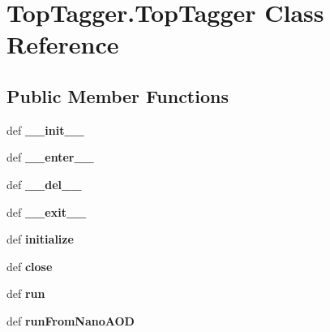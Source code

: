 \hypertarget{classTopTagger_1_1TopTagger}{\section{Top\-Tagger.\-Top\-Tagger Class Reference}
\label{classTopTagger_1_1TopTagger}
}
\subsection*{Public Member Functions}
\begin{DoxyCompactItemize}
\item 
\hypertarget{classTopTagger_1_1TopTagger_a161704f0abdbd30d84f9cbae3e6a3336}{def {\bfseries \-\_\-\-\_\-init\-\_\-\-\_\-}}\label{classTopTagger_1_1TopTagger_a161704f0abdbd30d84f9cbae3e6a3336}

\item 
\hypertarget{classTopTagger_1_1TopTagger_a01b9ce257815a42bf961804c02af4af4}{def {\bfseries \-\_\-\-\_\-enter\-\_\-\-\_\-}}\label{classTopTagger_1_1TopTagger_a01b9ce257815a42bf961804c02af4af4}

\item 
\hypertarget{classTopTagger_1_1TopTagger_a2397ccfb8f06a6313e40428920a52c1d}{def {\bfseries \-\_\-\-\_\-del\-\_\-\-\_\-}}\label{classTopTagger_1_1TopTagger_a2397ccfb8f06a6313e40428920a52c1d}

\item 
\hypertarget{classTopTagger_1_1TopTagger_a2eb507c390722239ff1896e29fc7ccfd}{def {\bfseries \-\_\-\-\_\-exit\-\_\-\-\_\-}}\label{classTopTagger_1_1TopTagger_a2eb507c390722239ff1896e29fc7ccfd}

\item 
\hypertarget{classTopTagger_1_1TopTagger_abc0aaa0982639e8b221c44326092771c}{def {\bfseries initialize}}\label{classTopTagger_1_1TopTagger_abc0aaa0982639e8b221c44326092771c}

\item 
\hypertarget{classTopTagger_1_1TopTagger_a0a0d4427b64669028e10aa40bff98582}{def {\bfseries close}}\label{classTopTagger_1_1TopTagger_a0a0d4427b64669028e10aa40bff98582}

\item 
\hypertarget{classTopTagger_1_1TopTagger_a44a4d842cfa4823f0c675fde9c7919cb}{def {\bfseries run}}\label{classTopTagger_1_1TopTagger_a44a4d842cfa4823f0c675fde9c7919cb}

\item 
\hypertarget{classTopTagger_1_1TopTagger_a2bd7fb2e34eaf765f87bf3b9d27aecba}{def {\bfseries run\-From\-Nano\-A\-O\-D}}\label{classTopTagger_1_1TopTagger_a2bd7fb2e34eaf765f87bf3b9d27aecba}

\end{DoxyCompactItemize}
